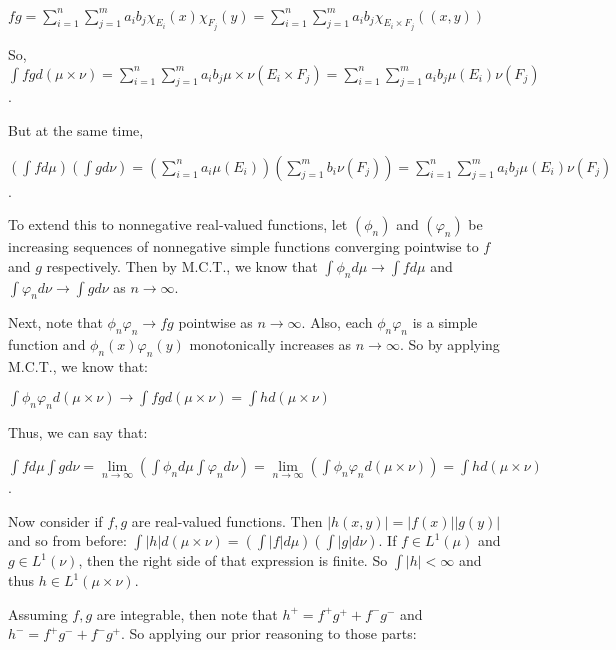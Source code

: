 \documentclass{book}
\newenvironment{myIndent}{%
   \begin{adjustwidth}{2.5em}{0em}%
}{%
   \end{adjustwidth}%
}
\newcommand{\retTwo}{\hfill\bigbreak}
\begin{document}
\begin{enumerate}
\begin{myIndent}
		{\centering $fg = \sum\limits_{i = 1}^n \sum\limits_{j = 1}^m a_ib_j\chi_{E_i}(x)\chi_{F_j}(y) = \sum\limits_{i=1}^n\sum\limits_{j=1}^m a_i b_j \chi_{E_i \times F_j}((x, y))$ \retTwo\par}

		\newpage

		So, $\int fg d(\mu \times \nu) = \sum\limits_{i=1}^n \sum\limits_{j=1}^m a_i b_j \mu \times \nu(E_i \times F_j) = \sum\limits_{i=1}^n \sum\limits_{j=1}^m a_i b_j \mu(E_i)\nu(F_j)$.\retTwo

		But at the same time, 
		
		{\centering $(\int f d\mu)(\int g d\nu) = (\sum\limits_{i=1}^n a_i\mu(E_i))(\sum\limits_{j=1}^m b_i\nu(F_j)) = \sum\limits_{i=1}^n \sum\limits_{j=1}^m a_i b_j \mu(E_i)\nu(F_j)$.\retTwo\par}

		To extend this to nonnegative real-valued functions, let $(\phi_n)$ and $(\varphi_n)$ be\\ increasing sequences of nonnegative simple functions converging pointwise to $f$ and $g$ respectively. Then by M.C.T., we know that $\int \phi_n d\mu \rightarrow \int f d\mu$ and $\int \varphi_n d\nu \rightarrow \int gd\nu$ as $n \rightarrow \infty$.\retTwo

		Next, note that $\phi_n\varphi_n \rightarrow fg$ pointwise as $n \rightarrow \infty$. Also, each $\phi_n\varphi_n$ is a simple function and $\phi_n(x)\varphi_n(y)$ monotonically increases as $n \rightarrow \infty$. So by applying M.C.T., we know that:

		{\centering $\int \phi_n \varphi_n d(\mu \times \nu) \rightarrow \int fg d(\mu \times \nu) = \int h d(\mu \times \nu)$ \retTwo\par}

		Thus, we can say that:

		{\centering $\int f d\mu \int g d\nu = \lim\limits_{n \rightarrow \infty} (\int \phi_n d\mu \int \varphi_n d\nu) = \lim\limits_{n \rightarrow \infty} (\int \phi_n \varphi_n d(\mu \times \nu)) = \int h d(\mu \times \nu)$. \retTwo\par}

		Now consider if $f, g$ are real-valued functions. Then $|h(x, y)| = |f(x)||g(y)|$ and so from before: $\int |h| d(\mu \times \nu) = (\int |f| d\mu)(\int |g|d\nu)$. If $f \in L^1(\mu)$ and $g \in L^1(\nu)$, then the right side of that expression is finite. So $\int |h| < \infty$ and thus $h \in L^1(\mu \times \nu)$.\retTwo

		Assuming $f, g$ are integrable, then note that $h^+ = f^+g^+ + f^-g^-$ and\\ $h^- = f^+g^- + f^-g^+$. So applying our prior reasoning to those parts:


\end{myIndent}
\end{enumerate}
\end{document}
